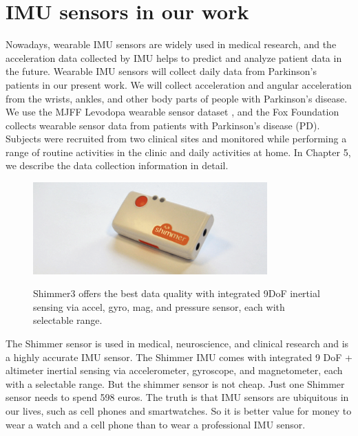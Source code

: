  
 \section{IMU sensors in our work}
Nowadays, wearable IMU sensors are widely used in medical research, and the acceleration data collected by IMU helps to predict and analyze patient data in the future. Wearable IMU sensors will collect daily data from Parkinson's patients in our present work. We will collect acceleration and angular acceleration from the wrists, ankles, and other body parts of people with Parkinson's disease. We use the MJFF Levodopa wearable sensor dataset \cite{MJFF}, and the Fox Foundation collects wearable sensor data from patients with Parkinson's disease (PD). Subjects were recruited from two clinical sites and monitored while performing a range of routine activities in the clinic and daily activities at home. In Chapter 5, we describe the data collection information in detail.\\

\begin{figure}[htbp]
\centering
\includegraphics[width=9cm]{report/pics/Shimmer Sensor.png}
\caption{Shimmer3 offers the best data quality with integrated 9DoF inertial sensing via accel, gyro, mag, and pressure sensor, each with selectable range.} \cite{ShimmerSensor}
\end{figure}
The Shimmer sensor is used in medical, neuroscience, and clinical research and is a highly accurate IMU sensor. The Shimmer IMU comes with integrated 9 DoF + altimeter inertial sensing via accelerometer, gyroscope, and magnetometer, each with a selectable range.\cite{ShimmerSensor} But the shimmer sensor is not cheap. Just one Shimmer sensor needs to spend 598 euros. The truth is that IMU sensors are ubiquitous in our lives, such as cell phones and smartwatches. So it is better value for money to wear a watch and a cell phone than to wear a professional IMU sensor.
